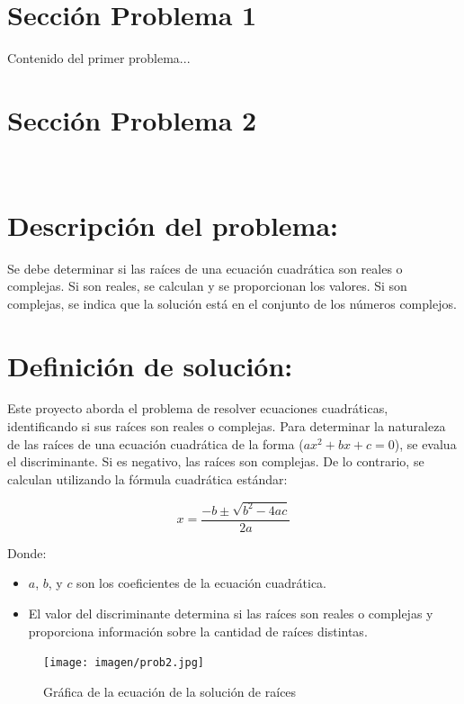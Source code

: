 \documentclass{IEEEcsmag}
\begin{document}
\section{Sección Problema 1}
Contenido del primer problema...
\clearpage







\section{Sección Problema 2} \\

\section*{Descripción del problema:}
Se debe determinar si las raíces de una ecuación cuadrática son reales o complejas. Si son reales, se calculan y se proporcionan los valores. Si son complejas, se indica que la solución está en el conjunto de los números complejos.


\section*{Definición de solución:}
Este proyecto aborda el problema de resolver ecuaciones cuadráticas, identificando si sus raíces son reales o complejas. 
Para determinar la naturaleza de las raíces de una ecuación cuadrática de la forma  (\(ax^2 + bx + c = 0\)), se evalua el discriminante. Si es negativo, las raíces son complejas. De lo contrario, se calculan utilizando la fórmula cuadrática estándar:

\[ x = \frac{-b \pm \sqrt{b^2 - 4ac}}{2a} \]

Donde:
\begin{itemize}
    \item \(a\), \(b\), y \(c\) son los coeficientes de la ecuación cuadrática.
    \item El valor del discriminante determina si las raíces son reales o complejas y proporciona información sobre la cantidad de raíces distintas.
\end{itemize}



\begin{figure}[h!]
    \centering
    \texttt{[image: imagen/prob2.jpg]}
    \caption{Gráfica de la ecuación de la solución de raíces}
    \label{fig:GraficaEcuacionRecta}
\end{figure}
\end{document}
